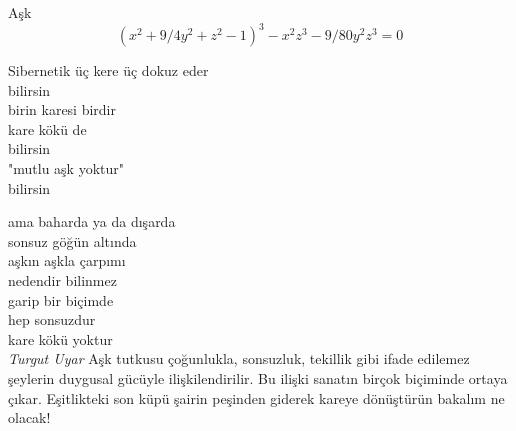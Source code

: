 \begin{surferPage}{Aşk}
\[(x^2+ 9/4y^2	+ z^2- 1)^3- x^2z^3	- 9/80y^2z^3	= 0\]

\singlespacing
Sibernetik
\singlespacing
üç kere üç dokuz eder\\
bilirsin\\
birin karesi birdir\\
kare kökü de\\
bilirsin\\
"mutlu aşk yoktur"\\
bilirsin\\
\vspace{0.4cm}

ama baharda ya da dışarda\\
sonsuz göğün altında\\
aşkın aşkla çarpımı\\
nedendir bilinmez\\
garip bir biçimde\\
hep sonsuzdur\\
kare kökü yoktur\\

{\it Turgut Uyar}
\singlespacing 
Aşk tutkusu çoğunlukla, sonsuzluk, tekillik gibi ifade edilemez şeylerin duygusal gücüyle ilişkilendirilir. Bu ilişki sanatın birçok biçiminde ortaya çıkar.
\singlespacing 
Eşitlikteki son küpü şairin peşinden giderek kareye dönüştürün bakalım ne olacak!
\end{surferPage}
